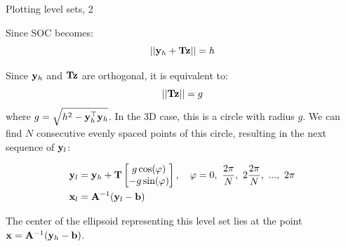 \documentclass{beamer}
\begin{document}
\begin{frame}{Plotting level sets, 2}
	\begin{flushleft}
		
		Since  SOC becomes:
		\begin{equation}
			||\mathbf{y}_h + \mathbf{T}\mathbf{z}|| = h
		\end{equation}
		
		Since $\mathbf{y}_h$ and $\mathbf{T}\mathbf{z}$ are orthogonal, it is equivalent to:
		\begin{equation}
			||\mathbf{T}\mathbf{z}|| = g
		\end{equation}
		where $g = \sqrt{ h^2 - \mathbf{y}_h^\top\mathbf{y}_h }$. In the 3D case, this is a circle with radius $g$. We can find $N$ consecutive evenly spaced points of this circle, resulting in the next sequence of $\mathbf{y}_l$:
		
		\begin{align}
			\bo{y}_l &= \bo{y}_h + \bo{T}
			\begin{bmatrix}
				g\cos(\varphi) \\ -g\sin(\varphi)
			\end{bmatrix}, \ \ \ \varphi = 0, \ \frac{2\pi}{N},\ 2\frac{2\pi}{N}, \ ..., \ 2\pi 
			\\
			\bo{x}_l  &=\bo{A}^{-1} (\bo{y}_l - \bo{b})
		\end{align}
		
		The center of the ellipsoid representing this level set lies at the point $\mathbf{x} =\mathbf{A}^{-1} (\mathbf{y}_h - \mathbf{b})$.
		
	\end{flushleft}
\end{frame}
\end{document}
